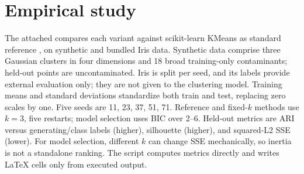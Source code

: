 \documentclass[conference]{IEEEtran}
\begin{document}
\section{Empirical study}
The attached  compares each variant against scikit-learn KMeans as standard reference \cite{pedregosa2011}, on synthetic and bundled Iris data. Synthetic data comprise three Gaussian clusters in four dimensions and 18 broad training-only contaminants; held-out points are uncontaminated. Iris is split per seed, and its labels provide external evaluation only; they are not given to the clustering model. Training means and standard deviations standardize both train and test, replacing zero scales by one. Five seeds are 11, 23, 37, 51, 71. Reference and fixed-\(k\) methods use \(k=3\), five restarts; model selection uses BIC over 2--6. Held-out metrics are ARI versus generating/class labels (higher), silhouette (higher), and squared-L2 SSE (lower). For model selection, different \(k\) can change SSE mechanically, so inertia is not a standalone ranking. The script computes metrics directly and writes LaTeX cells only from executed output.
\end{document}
